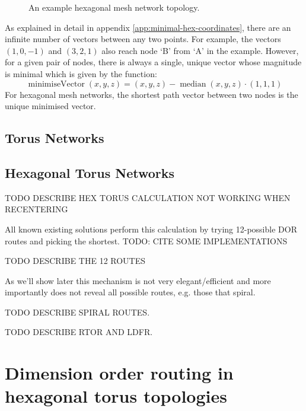 			\begin{figure}
				\center
				\caption{An example hexagonal mesh network topology.}
				\label{fig:hex-mesh-topology-coordinates}
			\end{figure}
			
			As explained in detail in appendix \ref{app:minimal-hex-coordinates},
			there are an infinite number of vectors between any two points. For
			example, the vectors $(1, 0, -1)$ and $(3, 2, 1)$ also reach node `B'
			from `A' in the example. However, for a given pair of nodes, there is
			always a single, unique vector whose magnitude is minimal which is
			given by the function:
			\begin{equation}
				\operatorname{minimiseVector}(x,y,z)
					= (x,y,z) - \operatorname{median}(x,y,z) \cdot (1,1,1)
			\end{equation}
			For hexagonal mesh networks, the shortest path vector between two nodes
			is the unique minimised vector.
		
		\subsection{Torus Networks}
			
			
		
		\subsection{Hexagonal Torus Networks}
		
			TODO DESCRIBE HEX TORUS CALCULATION NOT WORKING WHEN RECENTERING
			
			All known existing solutions perform this calculation by trying 12-possible
			DOR routes and picking the shortest. TODO: CITE SOME IMPLEMENTATIONS
			
			TODO DESCRIBE THE 12 ROUTES
			
			As we'll show later this mechanism is not very elegant/efficient and more
			importantly does not reveal all possible routes, e.g. those that spiral.
			
			TODO DESCRIBE SPIRAL ROUTES.
			
			TODO DESCRIBE RTOR AND LDFR.
		
	\section{Dimension order routing in hexagonal torus topologies}
		
